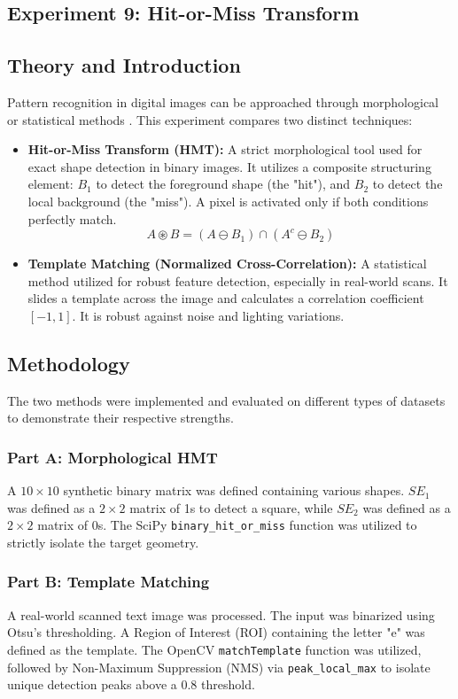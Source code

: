 \documentclass[11pt]{article}
\begin{document}
\pagebreak
\begin{center}
    \section{Experiment 9: Hit-or-Miss Transform}
\end{center}

\subsection{Theory and Introduction}
Pattern recognition in digital images can be approached through morphological or statistical methods \cite{gonzalez2018}. This experiment compares two distinct techniques:
\begin{itemize}
    \item \textbf{Hit-or-Miss Transform (HMT):} A strict morphological tool used for exact shape detection in binary images. It utilizes a composite structuring element: $B_1$ to detect the foreground shape (the "hit"), and $B_2$ to detect the local background (the "miss"). A pixel is activated only if both conditions perfectly match.
          $$A \circledast B = (A \ominus B_1) \cap (A^c \ominus B_2)$$
    \item \textbf{Template Matching (Normalized Cross-Correlation):} A statistical method utilized for robust feature detection, especially in real-world scans. It slides a template across the image and calculates a correlation coefficient $[-1, 1]$. It is robust against noise and lighting variations.
\end{itemize}

\subsection{Methodology}
The two methods were implemented and evaluated on different types of datasets to demonstrate their respective strengths.

\subsubsection*{Part A: Morphological HMT}
A $10 \times 10$ synthetic binary matrix was defined containing various shapes. $SE_1$ was defined as a $2 \times 2$ matrix of 1s to detect a square, while $SE_2$ was defined as a $2 \times 2$ matrix of 0s. The SciPy \verb|binary_hit_or_miss| function was utilized to strictly isolate the target geometry.

\subsubsection*{Part B: Template Matching}
A real-world scanned text image was processed. The input was binarized using Otsu's thresholding. A Region of Interest (ROI) containing the letter "e" was defined as the template. The OpenCV \verb|matchTemplate| function was utilized, followed by Non-Maximum Suppression (NMS) via \verb|peak_local_max| to isolate unique detection peaks above a $0.8$ threshold.
\end{document}
